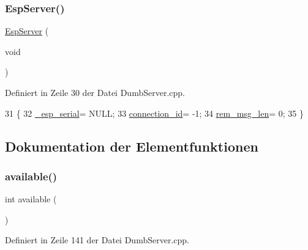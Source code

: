 \subsubsection{\texorpdfstring{Esp\+Server()}{EspServer()}}
{\footnotesize\ttfamily \hyperlink{classEspServer}{Esp\+Server} (\begin{DoxyParamCaption}\item[{void}]{ }\end{DoxyParamCaption})}



Definiert in Zeile 30 der Datei Dumb\+Server.\+cpp.


\begin{DoxyCode}
31 \{
32   \hyperlink{classEspServer_a552aab874ad99b696f4c997d6f5a4746}{\_esp\_serial}= NULL;
33   \hyperlink{classEspServer_a821bd4e05f0b260cc584a2d23bda0fff}{connection\_id}= -1;
34   \hyperlink{classEspServer_a34a62d83c82a13f441af983f9b212e25}{rem\_msg\_len}= 0;
35 \}
\end{DoxyCode}


\subsection{Dokumentation der Elementfunktionen}
\mbox{\label{classEspServer_a4549a76725f2e4c013e4d57018366109}} 
\subsubsection{\texorpdfstring{available()}{available()}}
{\footnotesize\ttfamily int available (\begin{DoxyParamCaption}{ }\end{DoxyParamCaption})\hspace{0.3cm}{\ttfamily [virtual]}}



Definiert in Zeile 141 der Datei Dumb\+Server.\+cpp.



